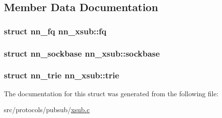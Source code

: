 \subsection{Member Data Documentation}
\subsubsection[{fq}]{\setlength{\rightskip}{0pt plus 5cm}struct {\bf nn\+\_\+fq} nn\+\_\+xsub\+::fq}\hypertarget{structnn__xsub_a53b351025205d5c32035a97e082d5d41}{}\label{structnn__xsub_a53b351025205d5c32035a97e082d5d41}
\subsubsection[{sockbase}]{\setlength{\rightskip}{0pt plus 5cm}struct {\bf nn\+\_\+sockbase} nn\+\_\+xsub\+::sockbase}\hypertarget{structnn__xsub_ae8be666a045e96afac3fa0c5479e6562}{}\label{structnn__xsub_ae8be666a045e96afac3fa0c5479e6562}
\subsubsection[{trie}]{\setlength{\rightskip}{0pt plus 5cm}struct {\bf nn\+\_\+trie} nn\+\_\+xsub\+::trie}\hypertarget{structnn__xsub_ad2717708af5bad6da6e686034dc91629}{}\label{structnn__xsub_ad2717708af5bad6da6e686034dc91629}


The documentation for this struct was generated from the following file\+:\begin{DoxyCompactItemize}
\item 
src/protocols/pubsub/\hyperlink{xsub_8c}{xsub.\+c}\end{DoxyCompactItemize}

